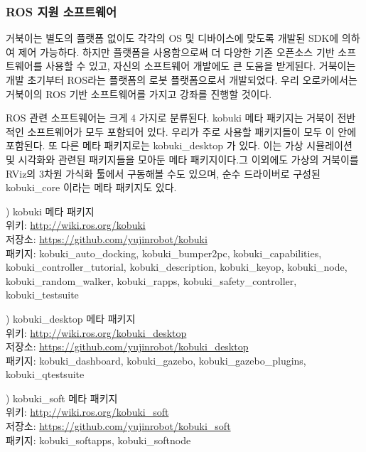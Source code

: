 \subsubsection{ROS 지원 소프트웨어}

거북이는 별도의 플랫폼 없이도 각각의 OS 및 디바이스에 맞도록 개발된 SDK에 의하여 제어 가능하다. 하지만 플랫폼을 사용함으로써 더 다양한 기존 오픈소스 기반 소프트웨어를 사용할 수 있고, 자신의 소프트웨어 개발에도 큰 도움을 받게된다. 거북이는 개발 초기부터 ROS라는 플랫폼의 로봇 플랫폼으로서 개발되었다. 우리 오로카에서는 거북이의 ROS 기반 소프트웨어를 가지고 강좌를 진행할 것이다.
 
ROS 관련 소프트웨어는 크게 4 가지로 분류된다. kobuki 메타 패키지는 거북이 전반적인 소프트웨어가 모두 포함되어 있다. 우리가 주로 사용할 패키지들이 모두 이 안에 포함된다. 또 다른 메타 패키지로는 kobuki\_desktop 가 있다. 이는 가상 시뮬레이션 및 시각화와 관련된 패키지들을 모아둔 메타 패키지이다.그 이외에도 가상의 거북이를 RViz의 3차원 가식화 툴에서 구동해볼 수도 있으며, 순수 드라이버로 구성된 kobuki\_core 이라는 메타 패키지도 있다.

\setcounter{num}{0}

\vspace{\baselineskip}
\noindent
{}
\thenum) kobuki 메타 패키지\\
위키: \url{http://wiki.ros.org/kobuki}\\
저장소: \url{https://github.com/yujinrobot/kobuki}\\
패키지: kobuki\_auto\_docking, kobuki\_bumper2pc, kobuki\_capabilities,\\
kobuki\_controller\_tutorial, kobuki\_description, kobuki\_keyop, kobuki\_node,\\
kobuki\_random\_walker, kobuki\_rapps, kobuki\_safety\_controller, kobuki\_testsuite

\vspace{\baselineskip}
\noindent
{}
\thenum) kobuki\_desktop 메타 패키지\\
위키: \url{http://wiki.ros.org/kobuki_desktop}\\
저장소: \url{https://github.com/yujinrobot/kobuki_desktop}\\
패키지: kobuki\_dashboard, kobuki\_gazebo, kobuki\_gazebo\_plugins, kobuki\_qtestsuite

\vspace{\baselineskip}
\noindent
{}
\thenum) kobuki\_soft 메타 패키지\\
위키: \url{http://wiki.ros.org/kobuki_soft}\\
저장소: \url{https://github.com/yujinrobot/kobuki_soft}\\
패키지: kobuki\_softapps, kobuki\_softnode

